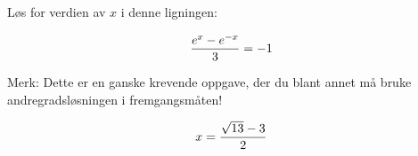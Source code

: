 

Løs for verdien av $x$ i denne ligningen:

$${e^x - e^{-x} \over 3} = -1$$

Merk: Dette er en ganske krevende oppgave, der du blant annet må bruke andregradsløsningen i fremgangsmåten!







$$x = {\sqrt{13} - 3 \over 2}$$










